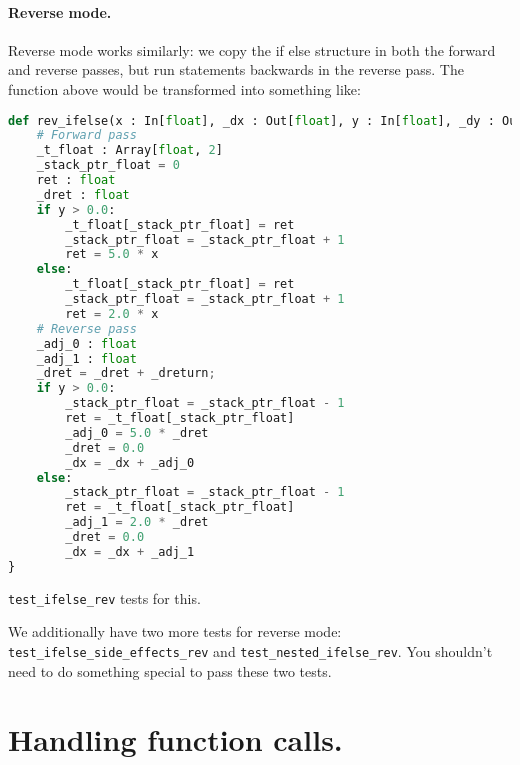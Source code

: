 \paragraph{Reverse mode.} Reverse mode works similarly: we copy the if else structure in both the forward and reverse passes, but run statements backwards in the reverse pass. The function above would be transformed into something like:
\begin{lstlisting}[language=Python]
def rev_ifelse(x : In[float], _dx : Out[float], y : In[float], _dy : Out[float], _dreturn : In[float]):
    # Forward pass
    _t_float : Array[float, 2]
    _stack_ptr_float = 0
    ret : float
    _dret : float
    if y > 0.0:
        _t_float[_stack_ptr_float] = ret
        _stack_ptr_float = _stack_ptr_float + 1
        ret = 5.0 * x
    else:
        _t_float[_stack_ptr_float] = ret
        _stack_ptr_float = _stack_ptr_float + 1
        ret = 2.0 * x
    # Reverse pass
    _adj_0 : float
    _adj_1 : float
    _dret = _dret + _dreturn;
    if y > 0.0:
        _stack_ptr_float = _stack_ptr_float - 1
        ret = _t_float[_stack_ptr_float]
        _adj_0 = 5.0 * _dret
        _dret = 0.0
        _dx = _dx + _adj_0
    else:
        _stack_ptr_float = _stack_ptr_float - 1
        ret = _t_float[_stack_ptr_float]
        _adj_1 = 2.0 * _dret
        _dret = 0.0
        _dx = _dx + _adj_1
}
\end{lstlisting}

\lstinline{test_ifelse_rev} tests for this.

We additionally have two more tests for reverse mode: \lstinline{test_ifelse_side_effects_rev} and \lstinline{test_nested_ifelse_rev}. You shouldn't need to do something special to pass these two tests.

\section{Handling function calls.}

